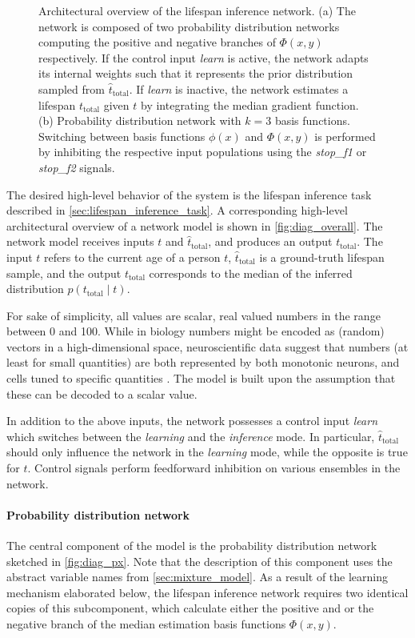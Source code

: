 \documentclass[a4paper,11pt]{article}
\begin{document}
\begin{figure}[p]
    \caption{Architectural overview of the lifespan inference network. (a) The network is composed of two probability distribution networks computing the positive and negative branches of $\Phi(x, y)$ respectively. If the control input \emph{learn} is active, the network adapts its internal weights such that it represents the prior distribution sampled from $\hat t_\mathrm{total}$. If \emph{learn} is inactive, the network estimates a lifespan $t_\mathrm{total}$ given $t$ by integrating the median gradient function. (b) Probability distribution network with $k = 3$ basis functions. Switching between basis functions $\phi(x)$ and $\Phi(x, y)$ is performed by inhibiting the respective input populations using the \textit{stop\_f1} or \textit{stop\_f2} signals.}
    \label{fig:diag}
\end{figure}

The desired high-level behavior of the system is the lifespan inference task described in \cref{sec:lifespan_inference_task}. A corresponding high-level architectural overview of a network model is shown in \cref{fig:diag_overall}. The network model receives inputs $t$ and $\hat t_\mathrm{total}$, and produces an output $t_\mathrm{total}$. The input $t$ refers to the current age of a person $t$, $\hat t_\mathrm{total}$ is a ground-truth lifespan sample, and the output $t_\mathrm{total}$ corresponds to the median of the inferred distribution $p(t_\mathrm{total} \mid t)$.

For sake of simplicity, all values are scalar, real valued numbers in the range between 0 and 100. While in biology numbers might be encoded as (random) vectors in a high-dimensional space, neuroscientific data suggest that numbers (at least for small quantities) are both represented by both monotonic neurons, and cells tuned to specific quantities \cite{nieder2009representation}. The model is built upon the assumption that these can be decoded to a scalar value.

In addition to the above inputs, the network possesses a control input \emph{learn} which switches between the \emph{learning} and the \emph{inference} mode. In particular, $\hat t_\mathrm{total}$ should only influence the network in the \emph{learning} mode, while the opposite is true for $t$. Control signals perform feedforward inhibition on various ensembles in the network.

\paragraph{Probability distribution network}
The central component of the model is the probability distribution network sketched in \cref{fig:diag_px}. Note that the description of this component uses the abstract variable names from \cref{sec:mixture_model}. As a result of the learning mechanism elaborated below, the lifespan inference network requires two identical copies of this subcomponent, which calculate either the positive and or the negative branch of the median estimation basis functions $\Phi(x, y)$.
\end{document}

